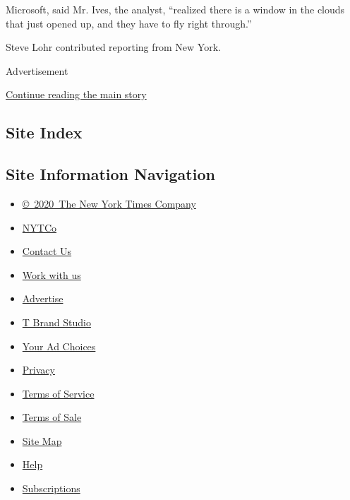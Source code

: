 Microsoft, said Mr. Ives, the analyst, ``realized there is a window in
the clouds that just opened up, and they have to fly right through.''

Steve Lohr contributed reporting from New York.

Advertisement

\protect\hyperlink{after-bottom}{Continue reading the main story}

\hypertarget{site-index}{%
\subsection{Site Index}\label{site-index}}

\hypertarget{site-information-navigation}{%
\subsection{Site Information
Navigation}\label{site-information-navigation}}

\begin{itemize}
\tightlist
\item
  \href{https://help.nytimes3xbfgragh.onion/hc/en-us/articles/115014792127-Copyright-notice}{©~2020~The
  New York Times Company}
\end{itemize}

\begin{itemize}
\tightlist
\item
  \href{https://www.nytco.com/}{NYTCo}
\item
  \href{https://help.nytimes3xbfgragh.onion/hc/en-us/articles/115015385887-Contact-Us}{Contact
  Us}
\item
  \href{https://www.nytco.com/careers/}{Work with us}
\item
  \href{https://nytmediakit.com/}{Advertise}
\item
  \href{http://www.tbrandstudio.com/}{T Brand Studio}
\item
  \href{https://www.nytimes3xbfgragh.onion/privacy/cookie-policy\#how-do-i-manage-trackers}{Your
  Ad Choices}
\item
  \href{https://www.nytimes3xbfgragh.onion/privacy}{Privacy}
\item
  \href{https://help.nytimes3xbfgragh.onion/hc/en-us/articles/115014893428-Terms-of-service}{Terms
  of Service}
\item
  \href{https://help.nytimes3xbfgragh.onion/hc/en-us/articles/115014893968-Terms-of-sale}{Terms
  of Sale}
\item
  \href{https://spiderbites.nytimes3xbfgragh.onion}{Site Map}
\item
  \href{https://help.nytimes3xbfgragh.onion/hc/en-us}{Help}
\item
  \href{https://www.nytimes3xbfgragh.onion/subscription?campaignId=37WXW}{Subscriptions}
\end{itemize}
